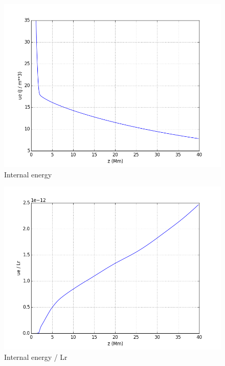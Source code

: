\documentclass[10pt]{book}
\begin{document}
\begin{figure}[!ht]
 \centering
 \includegraphics[scale=0.5]{ue.png}
 \caption{ Internal energy}
\end{figure}

\begin{figure}[!ht]
 \centering
 \includegraphics[scale=0.5]{ueDivLr.png}
 \caption{ Internal energy / Lr}
\end{figure}
\end{document}
